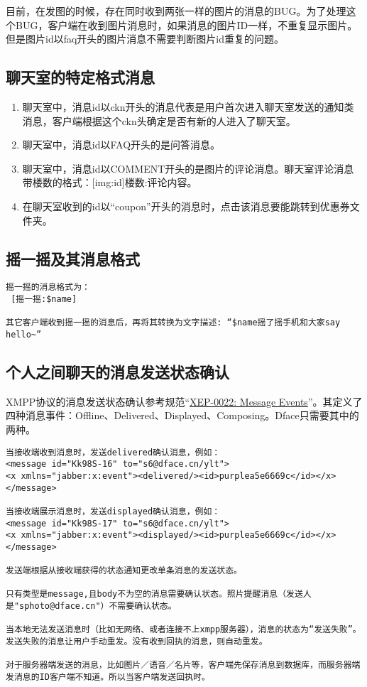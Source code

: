 目前，在发图的时候，存在同时收到两张一样的图片的消息的BUG。为了处理这个BUG，客户端在收到图片消息时，如果消息的图片ID一样，不重复显示图片。但是图片id以faq开头的图片消息不需要判断图片id重复的问题。



\subsection{聊天室的特定格式消息}
\begin{enumerate}
\item 聊天室中，消息id以ckn开头的消息代表是用户首次进入聊天室发送的通知类消息，客户端根据这个ckn头确定是否有新的人进入了聊天室。
\item 聊天室中，消息id以FAQ开头的是问答消息。
\item 聊天室中，消息id以COMMENT开头的是图片的评论消息。聊天室评论消息带楼数的格式：[img:id]楼数:评论内容。
\item 在聊天室收到的id以“coupon”开头的消息时，点击该消息要能跳转到优惠券文件夹。
\end{enumerate}


\subsection{摇一摇及其消息格式}

\begin{verbatim}
摇一摇的消息格式为：
 [摇一摇:$name]

其它客户端收到摇一摇的消息后，再将其转换为文字描述: “$name摇了摇手机和大家say hello~”
\end{verbatim}



\subsection{个人之间聊天的消息发送状态确认}
XMPP协议的消息发送状态确认参考规范“\href{http://xmpp.org/extensions/xep-0022.html}{XEP-0022: Message Events}”。其定义了四种消息事件：Offline、Delivered、Displayed、Composing。Dface只需要其中的两种。

\begin{verbatim}
当接收端收到消息时，发送delivered确认消息，例如：
<message id="Kk98S-16" to="s6@dface.cn/ylt">
<x xmlns="jabber:x:event"><delivered/><id>purplea5e6669c</id></x>
</message>

当接收端展示消息时，发送displayed确认消息，例如：
<message id="Kk98S-17" to="s6@dface.cn/ylt">
<x xmlns="jabber:x:event"><displayed/><id>purplea5e6669c</id></x>
</message>

发送端根据从接收端获得的状态通知更改单条消息的发送状态。

只有类型是message,且body不为空的消息需要确认状态。照片提醒消息（发送人是"sphoto@dface.cn"）不需要确认状态。

当本地无法发送消息时（比如无网络、或者连接不上xmpp服务器），消息的状态为“发送失败”。发送失败的消息让用户手动重发。没有收到回执的消息，则自动重发。

对于服务器端发送的消息，比如图片／语音／名片等，客户端先保存消息到数据库，而服务器端发消息的ID客户端不知道。所以当客户端发送回执时。

\end{verbatim}

